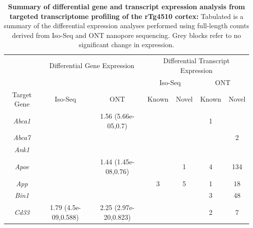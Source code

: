\begin{table}[]
	\centering
	\captionsetup{width=0.95\textwidth}
	\caption[Summary of differential gene and transcript expression analysis from targeted transcriptome profiling of the rTg4510 cortex]%
	{\textbf{Summary of differential gene and transcript expression analysis from targeted transcriptome profiling of the rTg4510 cortex:} Tabulated is a summary of the differential expression analyses performed using full-length counts derived from Iso-Seq and ONT nanopore sequencing. Grey blocks refer to no significant change in expression.}
	\label{tab: de_analysis}
	\setlength\tabcolsep{4pt} %
	\begin{threeparttable}
	\begin{tabular}{@{}ccccccc@{}}
		\toprule
		&
		\multicolumn{2}{c}{Differential Gene Expression\tnote{a} } &
		\multicolumn{4}{c}{Differential Transcript Expression\tnote{b}} \\ \cmidrule(l){2-7} 
		&
		&
		&
		\multicolumn{2}{c}{Iso-Seq} &
		\multicolumn{2}{c}{ONT} \\ \cmidrule(l){4-7} 
		\multirow{-3}{*}{Target Gene} &
		\multirow{-2}{*}{Iso-Seq} &
		\multirow{-2}{*}{ONT} &
		Known &
		Novel &
		Known &
		Novel \\ \midrule
		\textit{Abca1} &
		\cellcolor[HTML]{EFEFEF} &
		1.56 (5.66e-05,0.7) &
		\cellcolor[HTML]{EFEFEF} &
		\cellcolor[HTML]{EFEFEF} &
		1 &
		\cellcolor[HTML]{EFEFEF} \\
		\textit{Abca7} &
		\cellcolor[HTML]{EFEFEF} &
		\cellcolor[HTML]{EFEFEF} &
		\cellcolor[HTML]{EFEFEF} &
		\cellcolor[HTML]{EFEFEF} &
		\cellcolor[HTML]{EFEFEF} &
		2 \\
		\textit{Ank1} &
		\cellcolor[HTML]{EFEFEF} &
		\cellcolor[HTML]{EFEFEF} &
		\cellcolor[HTML]{EFEFEF} &
		\cellcolor[HTML]{EFEFEF} &
		\cellcolor[HTML]{EFEFEF} &
		\cellcolor[HTML]{EFEFEF} \\
		\textit{Apoe} &
		\cellcolor[HTML]{EFEFEF} &
		1.44 (1.45e-08,0.76) &
		\cellcolor[HTML]{EFEFEF}&
		1 &
		4 &
		134 \\
		\textit{App} &
		\cellcolor[HTML]{EFEFEF} &
		\cellcolor[HTML]{EFEFEF} &
		3 &
		5 &
		1 &
		18 \\
		\textit{Bin1} &
		\cellcolor[HTML]{EFEFEF} &
		\cellcolor[HTML]{EFEFEF} &
		\cellcolor[HTML]{EFEFEF} &
		\cellcolor[HTML]{EFEFEF} &
		3 &
		48 \\
		\textit{Cd33} &
		1.79 (4.5e-09,0.588) &
		2.25 (2.97e-20,0.823) &
		\cellcolor[HTML]{EFEFEF} &
		\cellcolor[HTML]{EFEFEF} &
		2 &
		7 \\

\end{tabular}
\end{threeparttable}
\end{table}
